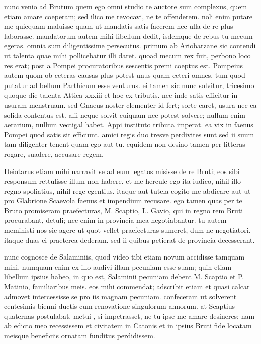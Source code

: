  nunc venio ad Brutum quem ego omni studio te auctore sum complexus, quem etiam amare coeperam; sed ilico me revocavi, ne te offenderem. noli enim putare me quicquam maluisse quam ut mandatis satis facerem nec ulla de re plus laborasse. mandatorum autem mihi libellum dedit, isdemque de rebus tu mecum egeras. omnia sum diligentissime persecutus. primum ab Ariobarzane sic contendi ut talenta quae mihi pollicebatur illi daret. quoad mecum rex fuit, perbono loco res erat; post a Pompei procuratoribus sescentis premi coeptus est. Pompeius autem quom ob ceteras causas plus potest unus quam ceteri omnes, tum quod putatur ad bellum Parthicum esse venturus. ei tamen sic nunc solvitur, tricesimo quoque die talenta Attica xxxiii et hoc ex tributis. nec inde satis efficitur in usuram menstruam. sed Gnaeus noster clementer id fert; sorte caret, usura nec ea solida contentus est. alii neque solvit cuiquam nec potest solvere; nullum enim aerarium, nullum vectigal habet. Appi instituto tributa imperat. ea vix in faenus Pompei quod satis sit efficiunt. amici regis duo tresve perdivites sunt sed ii suum tam diligenter tenent quam ego aut tu. equidem non desino tamen per litteras rogare, suadere, accusare regem.

 Deiotarus etiam mihi narravit se ad eum legatos misisse de re Bruti; eos sibi responsum rettulisse illum non habere. et me hercule ego ita iudico, nihil illo regno spoliatius, nihil rege egentius. itaque aut tutela cogito me abdicare aut ut pro Glabrione Scaevola faenus et impendium recusare. ego tamen quas per te Bruto promiseram praefecturas, M. Scaptio, L. Gavio, qui in regno rem Bruti procurabant, detuli; nec enim in provincia mea negotiabantur. tu autem meministi nos sic agere ut quot vellet praefecturas sumeret, dum ne negotiatori. itaque duas ei praeterea dederam. sed ii quibus petierat de provincia decesserant.

 nunc cognosce de Salaminiis, quod video tibi etiam novum accidisse tamquam mihi. numquam enim ex illo audivi illam pecuniam esse suam; quin etiam libellum ipsius habeo, in quo est, Salaminii pecuniam debent M. Scaptio et P. Matinio, familiaribus meis. eos mihi commendat; adscribit etiam et quasi calcar admovet intercessisse se pro iis magnam pecuniam. confeceram ut solverent centesimis bienni ductis cum renovatione singulorum annorum. at Scaptius quaternas postulabat. metui , si impetrasset, ne tu ipse me amare desineres; nam ab edicto meo recessissem et civitatem in Catonis et in ipsius Bruti fide locatam meisque beneficiis ornatam funditus perdidissem.

